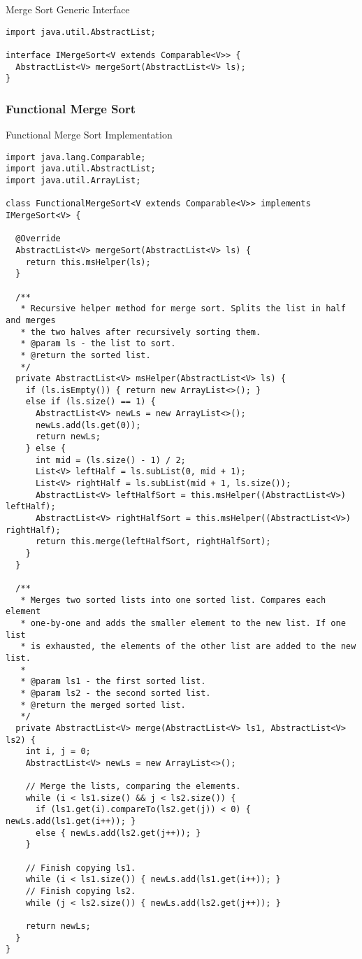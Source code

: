 \begin{cl}[]{Merge Sort Generic Interface}
\begin{lstlisting}[language=MyJava]
import java.util.AbstractList;

interface IMergeSort<V extends Comparable<V>> {
  AbstractList<V> mergeSort(AbstractList<V> ls);
}
\end{lstlisting}
\end{cl}

\subsubsection*{Functional Merge Sort}
\begin{cl}[]{Functional Merge Sort Implementation}
\begin{lstlisting}[language=MyJava]
import java.lang.Comparable;
import java.util.AbstractList;
import java.util.ArrayList;
  
class FunctionalMergeSort<V extends Comparable<V>> implements IMergeSort<V> {
  
  @Override
  AbstractList<V> mergeSort(AbstractList<V> ls) {
    return this.msHelper(ls);
  }
  
  /**
   * Recursive helper method for merge sort. Splits the list in half and merges
   * the two halves after recursively sorting them.
   * @param ls - the list to sort.
   * @return the sorted list.
   */
  private AbstractList<V> msHelper(AbstractList<V> ls) {
    if (ls.isEmpty()) { return new ArrayList<>(); }
    else if (ls.size() == 1) {
      AbstractList<V> newLs = new ArrayList<>();
      newLs.add(ls.get(0));
      return newLs;
    } else {
      int mid = (ls.size() - 1) / 2;
      List<V> leftHalf = ls.subList(0, mid + 1);
      List<V> rightHalf = ls.subList(mid + 1, ls.size());
      AbstractList<V> leftHalfSort = this.msHelper((AbstractList<V>) leftHalf);
      AbstractList<V> rightHalfSort = this.msHelper((AbstractList<V>) rightHalf);
      return this.merge(leftHalfSort, rightHalfSort);
    }
  }
  
  /**
   * Merges two sorted lists into one sorted list. Compares each element 
   * one-by-one and adds the smaller element to the new list. If one list 
   * is exhausted, the elements of the other list are added to the new list.
   *
   * @param ls1 - the first sorted list.
   * @param ls2 - the second sorted list.
   * @return the merged sorted list.
   */
  private AbstractList<V> merge(AbstractList<V> ls1, AbstractList<V> ls2) {
    int i, j = 0;
    AbstractList<V> newLs = new ArrayList<>();
          
    // Merge the lists, comparing the elements.
    while (i < ls1.size() && j < ls2.size()) {
      if (ls1.get(i).compareTo(ls2.get(j)) < 0) { newLs.add(ls1.get(i++)); }
      else { newLs.add(ls2.get(j++)); }
    }
  
    // Finish copying ls1.
    while (i < ls1.size()) { newLs.add(ls1.get(i++)); }
    // Finish copying ls2.
    while (j < ls2.size()) { newLs.add(ls2.get(j++)); }

    return newLs;
  }
}
\end{lstlisting}
\end{cl}


